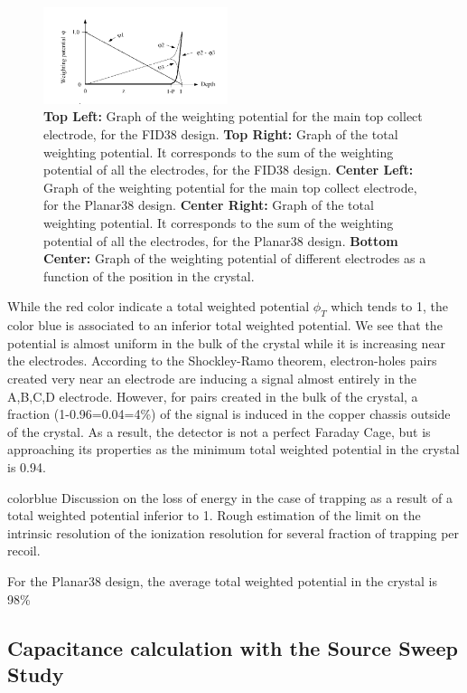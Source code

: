 \begin{figure}
\includegraphics[width=0.48\textwidth]{Figures/Electrodes/ramo_potential.png}
\caption{
\textbf{Top Left:} Graph of the weighting potential for the main top collect electrode, for the FID38 design.
\textbf{Top Right:} Graph of the total weighting potential. It corresponds to the sum of the weighting potential of all the electrodes, for the FID38 design.
\textbf{Center Left:} Graph of the weighting potential for the main top collect electrode, for the Planar38 design.
\textbf{Center Right:} Graph of the total weighting potential. It corresponds to the sum of the weighting potential of all the electrodes, for the Planar38 design.
\textbf{Bottom Center:} Graph of the weighting potential of different electrodes as a function of the position in the crystal.
}
\label{fig:weighting-potential}
\end{figure}

While the red color indicate a total weighted potential $\phi_T$ which tends to 1, the color blue is associated to an inferior total weighted potential. We see that the potential is almost uniform in the bulk of the crystal while it is increasing near the electrodes. According to the Shockley-Ramo theorem, electron-holes pairs created very near an electrode are inducing a signal almost entirely in the A,B,C,D electrode. However, for pairs created in the bulk of the crystal, a fraction (1-0.96=0.04=4\%) of the signal is induced in the copper chassis outside of the crystal. As a result, the detector is not a perfect Faraday Cage, but is approaching its properties as the minimum total weighted potential in the crystal is 0.94.  

{ color{blue} Discussion on the loss of energy in the case of trapping as a result of a total weighted potential inferior to 1. Rough estimation of the limit on the intrinsic resolution of the ionization resolution for several fraction of trapping per recoil.}

For the Planar38 design, the average total weighted potential in the crystal is 98\%

\subsection{Capacitance calculation with the Source Sweep Study}
\label{par:capacitance-matrix}

